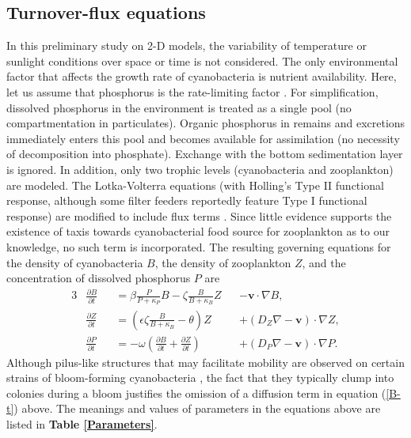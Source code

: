 \documentclass{article}
\renewcommand\vec{\mathbf}
\begin{document}
\subsection*{Turnover-flux equations}
In this preliminary study on 2-D models, the variability of temperature or sunlight conditions over space or time is not considered. The only environmental factor that affects the growth rate of cyanobacteria is nutrient availability. Here, let us assume that phosphorus is the rate-limiting factor \cite{LimitingFactor}. For simplification, dissolved phosphorus in the environment is treated as a single pool (no compartmentation in particulates). Organic phosphorus in remains and excretions immediately enters this pool and becomes available for assimilation (no necessity of decomposition into phosphate). Exchange with the bottom sedimentation layer is ignored. In addition, only two trophic levels (cyanobacteria and zooplankton) are modeled. The Lotka-Volterra equations (with Holling's Type II functional response, although some filter feeders reportedly feature Type I functional response) are modified to include flux terms \cite{DumitranVuta, Holling, FilterFeeder, PlanktonSystems}. Since little evidence supports the existence of taxis towards cyanobacterial food source for zooplankton as to our knowledge, no such term is incorporated. The resulting governing equations for the density of cyanobacteria $B$, the density of zooplankton $Z$, and the concentration of dissolved phosphorus $P$ are
\begin{alignat}{3}
    &\frac{\partial B}{\partial t} &&= \beta\frac{P}{P + \kappa_P}B - \zeta\frac{B}{B + \kappa_B}Z && - \vec{v} \cdot \nabla B, \label{B-t}\\
    &\frac{\partial Z}{\partial t} &&= (\epsilon\zeta\frac{B}{B + \kappa_B} - \theta) Z &&+ (D_Z\nabla - \vec{v}) \cdot \nabla Z, \label{Z-t}\\
    &\frac{\partial P}{\partial t} &&= -\omega(\frac{\partial B}{\partial t} + \frac{\partial Z}{\partial t}) &&+ (D_P\nabla - \vec{v}) \cdot \nabla P \label{P-t}.
\end{alignat}
Although pilus-like structures that may facilitate mobility are observed on certain strains of bloom-forming cyanobacteria \cite{MaPilus, Mw}, the fact that they typically clump into colonies during a bloom justifies the omission of a diffusion term in equation (\ref{B-t}) above. The meanings and values of parameters in the equations above are listed in \textbf{Table \ref{Parameters}}.
\end{document}
